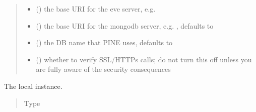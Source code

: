 \documentclass[letterpaper,10pt,english]{sphinxmanual}
\begin{document}
\begin{fulllineitems}
\begin{quote}
\begin{description}
\begin{itemize}
\item {} 
\sphinxAtStartPar
{} () \textendash{} the base URI for the eve server, e.g. 

\item {} 
\sphinxAtStartPar
{} (\sphinxstyleliteralemphasis{\sphinxupquote{, }}) \textendash{} the base URI for the mongodb server, e.g. , defaults to 

\item {} 
\sphinxAtStartPar
{} (\sphinxstyleliteralemphasis{\sphinxupquote{, }}) \textendash{} the DB name that PINE uses, defaults to 

\item {} 
\sphinxAtStartPar
{} (\sphinxstyleliteralemphasis{\sphinxupquote{, }}) \textendash{} whether to verify SSL/HTTPs calls; do not turn this off unless you
are fully aware of the security consequences

\end{itemize}

\end{description}\end{quote}

\begin{fulllineitems}
\label{\detokenize{autoapi/pine/client/index:pine.client.LocalPineClient.eve}}
\sphinxAtStartPar
The local  instance.
\begin{quote}\begin{description}
\item[{Type}] \leavevmode
\sphinxAtStartPar
{\hyperref[\detokenize{autoapi/pine/client/client/index:pine.client.client.EveClient}]{}}


\end{description}
\end{quote}
\end{fulllineitems}
\end{fulllineitems}
\end{document}

